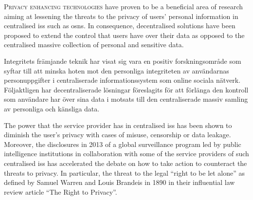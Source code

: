 


    {
    \lettrine{\textcolor[gray]{.25}{P}}{rivacy enhancing technologies}\csname@restorepar\endcsname\everypar{} 
    have proven to be a beneficial area of research aiming at lessening the threats 
    to the privacy of users' personal information in centralised \aclp*{is} such 
    as \aclp*{osn}. In consequence, decentralised solutions have been proposed to 
    extend the control that users have over their data as opposed to the centralised 
    massive collection of personal and sensitive data.\par
    }
    Integritets främjande teknik har visat sig vara en positiv forskningsområde 
    som syftar till att minska hoten mot den personliga integriteten av användarnas 
    personuppgifter i centraliserade informationssystem som online sociala nätverk. 
    Följaktligen har decentraliserade lösningar föreslagits för att förlänga den 
    kontroll som användare har över sina data i motsats till den centraliserade 
    massiv samling av personliga och känsliga data.
    
    The power that the service provider has in centralised \aclp*{is} has been shown 
    to diminish the user's privacy with cases of misuse, censorship or data leakage. 
    Moreover, the disclosures in 2013 of a global surveillance program led by public 
    intelligence institutions in collaboration with some of the service providers 
    of such centralised \aclp*{is} has accelerated the debate on how to take action 
    to counteract the threats to privacy. In particular, the threat to the legal 
    ``right to be let alone'' as defined by Samuel Warren and Louis Brandeis in 
    1890 in their influential law review article ``The Right to Privacy''.
    
